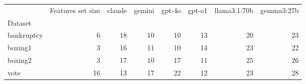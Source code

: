 \begin{tabular}{lrrrrrrr}
\toprule
 & Features set size & claude & gemini & gpt-4o & gpt-o1 & llama3.1:70b & gemma3:27b \\
Dataset &  &  &  &  &  &  &  \\
\midrule
bankruptcy & 6 & 18 & 10 & 10 & 13 & 20 & 23 \\
boxing1 & 3 & 16 & 11 & 10 & 14 & 23 & 22 \\
boxing2 & 3 & 17 & 10 & 17 & 11 & 25 & 26 \\
vote & 16 & 13 & 17 & 22 & 12 & 23 & 28 \\
\bottomrule
\end{tabular}
